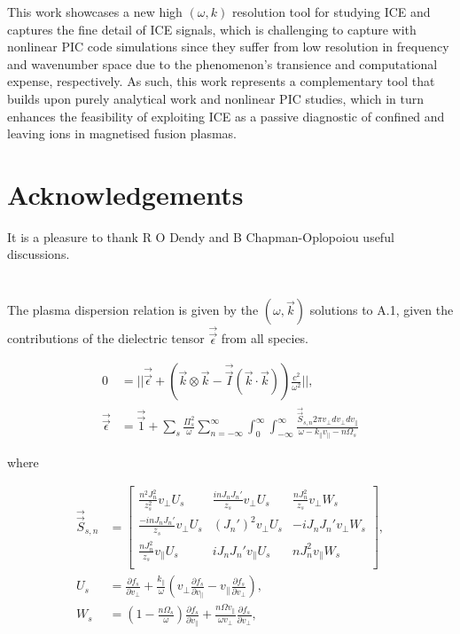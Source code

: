\documentclass[12pt]{iopart}
\begin{document}
This work showcases a new high $(\omega,k)$ resolution tool for studying ICE and captures the fine detail of ICE signals, which is challenging to capture with nonlinear PIC code simulations since they suffer from low resolution in frequency and wavenumber space due to the phenomenon's transience and computational expense, respectively. As such, this work represents a complementary tool that builds upon purely analytical work and nonlinear PIC studies, which in turn enhances the feasibility of exploiting ICE as a passive diagnostic of confined and leaving ions in magnetised fusion plasmas.

\section{Acknowledgements}

It is a pleasure to thank R O Dendy and B Chapman-Oplopoiou useful discussions.

\appendix
\section{}

The plasma dispersion relation\cite{Stix} is given by the $(\omega,\vec{k})$ solutions to A.1, given the contributions of the dielectric tensor $\vec{\vec{\epsilon}}$ from all species.

\begin{align}
    0 &= ||\vec{\vec{\epsilon}} + \left(\vec{k} \otimes \vec{k} - \vec{\vec{I}}(\vec{k}\cdot\vec{k})\right) \frac{c^2}{\omega^2}||,\\
    \vec{\vec{\epsilon}} &= \vec{\vec{1}} + \sum_s \frac{\Pi_s^2}{\omega}\sum_{n=-\infty}^{\infty}
    \int_0^{\infty}
    \int_{-\infty}^{\infty}\frac{\vec{\vec{S}}_{s,n} 2\pi v_\perp dv_\perp dv_\parallel}{\omega - k_\parallel v_\parallel - n \Omega_s}
\end{align}

where

\begin{align}
\vec{\vec{S}}_{s,n} &=
\begin{bmatrix}
\frac{n^2J_n^2}{z_s^2}v_\perp U_s & \frac{inJ_nJ_n'}{z_s}v_\perp U_s & \frac{n J_n^2}{z_s} v_\perp W_s\\
\frac{-inJ_nJ_n'}{z_s}v_\perp U_s & (J_n')^2 v_\perp U_s & -iJ_n J_n' v_\perp W_s \\
\frac{nJ_n^2}{z_s}v_\parallel U_s & iJ_nJ_n'v_\parallel U_s & n J_n^2 v_\parallel W_s \\
\end{bmatrix},\\
U_s &= \frac{\partial f_s}{\partial v_\perp} + \frac{k_\parallel}{\omega}  \left(v_\perp \frac{\partial f_s}{\partial v_\parallel} - v_\parallel \frac{\partial f_s}{\partial v_\perp}\right), \\
W_s &=\left(1- \frac{n\Omega_s}{\omega}\right)\frac{\partial f_s}{\partial v_\parallel} + \frac{n\Omega v_\parallel}{\omega v_\perp}\frac{\partial f_s}{\partial v_\perp},\\
\end{align}
\end{document}
